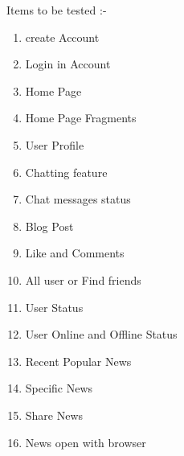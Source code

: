 \bigskip
\noindent
Items to be tested :-  
\begin{enumerate}
	\item create Account
	\item Login in Account
	\item Home Page
	\item Home Page Fragments
	\item User Profile
	\item Chatting feature
	\item Chat messages status
	\item Blog Post
	\item Like and Comments
	\item All user or Find friends
	\item User Status
	\item User Online and Offline Status 
	\item Recent Popular News
	\item Specific News
	\item Share News
	\item News open with browser
	
\end{enumerate}

